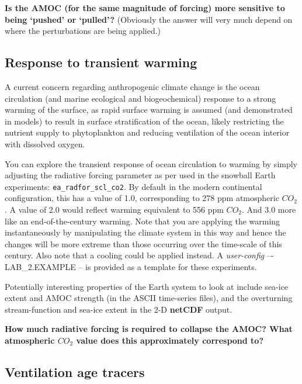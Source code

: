 \documentclass[11pt,fleqn]{book} %
\begin{document}
\textbf{Is the AMOC (for the same magnitude of forcing) more sensitive to being ‘pushed’ or ‘pulled’?} (Obviously the answer will very much depend on where the perturbations are being applied.)


\subsection{Response to transient warming}

A current concern regarding anthropogenic climate change is the ocean circulation (and marine ecological and biogeochemical) response to a strong warming of the surface, as rapid surface warming is assumed (and demonstrated in models) to result in surface stratification of the ocean, likely restricting the nutrient supply to phytoplankton and reducing ventilation of the ocean interior with dissolved oxygen.

You can explore the transient response of ocean circulation to warming by simply adjusting the radiative forcing parameter as per used in the snowball Earth experiments: \texttt{ea\_radfor\_scl\_co2}. By default in the modern continental configuration, this has a value of 1.0, corresponding to 278 ppm atmospheric \(CO_{2}\). A value of 2.0 would reflect warming equivalent to 556 ppm \(CO_{2}\). And 3.0 more like an end-of-the-century warming. Note that you are applying the warming instantaneously by manipulating the climate system in this way and hence the changes will be more extreme than those occurring over the time-scale of this century. Also note that a cooling could be applied instead. A \textit{user-config} –- \textsf{\footnotesize LAB\_2.EXAMPLE} – is provided as a template for these experiments.

Potentially interesting properties of the Earth system to look at include sea-ice extent and AMOC strength (in the ASCII time-series files), and the overturning stream-function and sea-ice extent in the 2-D \textbf{netCDF} output.

\textbf{How much radiative forcing is required to collapse the AMOC? What atmospheric \(CO_{2}\) value does this approximately correspond to?
}


\subsection{Ventilation age tracers}
\end{document}
